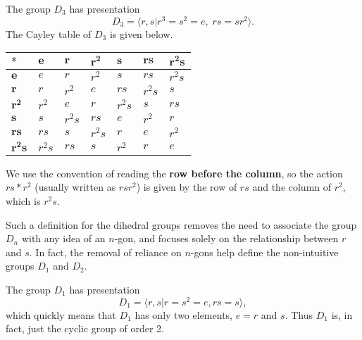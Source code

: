 \begin{example}\label{example-presentation-of-D3}
    The group $D_3$ has presentation
    \[
        D_3 = \langle r, s \vert r^3 = s^2 = e,\;rs = sr^2 \rangle.
    \]
    The Cayley table of $D_3$ is given below.

    \begin{table}[h]
        \centering
        \begin{tabular}{|l|l|l|l|l|l|l|}
        \hline
        $\boldsymbol{\ast}$ & $\boldsymbol{e}$ & $\boldsymbol{r}$ & $\boldsymbol{r^2}$ & $\boldsymbol{s}$ & $\boldsymbol{rs}$ & $\boldsymbol{r^2s}$ \\ \hline
        $\boldsymbol{e}$    & $e$    & $r$    & $r^2$  & $s$    & $rs$   & $r^2s$ \\ \hline
        $\boldsymbol{r}$    & $r$    & $r^2$  & $e$    & $rs$   & $r^2s$ & $s$    \\ \hline
        $\boldsymbol{r^2}$  & $r^2$  & $e$    & $r$    & $r^2s$ & $s$    & $rs$   \\ \hline
        $\boldsymbol{s}$    & $s$    & $r^2s$ & $rs$   & $e$    & $r^2$  & $r$    \\ \hline
        $\boldsymbol{rs}$   & $rs$   & $s$    & $r^2s$ & $r$    & $e$    & $r^2$  \\ \hline
        $\boldsymbol{r^2s}$ & $r^2s$ & $rs$   & $s$    & $r^2$  & $r$    & $e$    \\ \hline
        \end{tabular}
    \end{table}

    We use the convention of reading the \textbf{row before the column}, so the action $rs \ast r^2$ (usually written as $rsr^2$) is given by the row of $rs$ and the column of $r^2$, which is $r^2s$.
\end{example}

Such a definition for the dihedral groups removes the need to associate the group $D_n$ with any idea of an $n$-gon, and focuses solely on the relationship between $r$ and $s$. In fact, the removal of reliance on $n$-gons help define the non-intuitive groups $D_1$ and $D_2$.
\begin{example}
    The group $D_1$ has presentation
    \[
        D_1 = \langle r, s \vert r = s^2 = e, rs = s \rangle,
    \]
    which quickly means that $D_1$ has only two elements, $e = r$ and $s$. Thus $D_1$ is, in fact, just the cyclic group of order 2.
\end{example}

